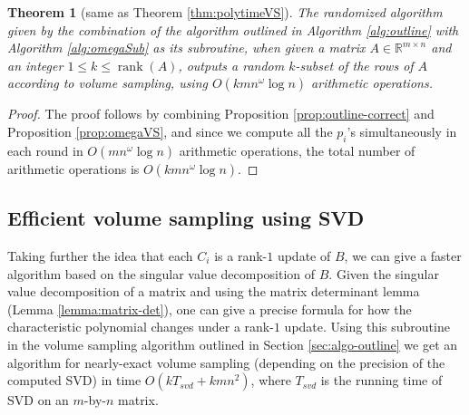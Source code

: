 \documentclass[11pt]{article}
\newcommand{\rank}{\operatorname{rank}}
\newtheorem{theorem}{Theorem}
\def\reals{\mathbb{R}}
\begin{document}
\begin{theorem}[same as Theorem \ref{thm:polytimeVS}]
The randomized algorithm given by the combination of the algorithm outlined in Algorithm \ref{alg:outline} with Algorithm \ref{alg:omegaSub} as its subroutine, when given a matrix $A \in \reals^{m \times n}$ and an integer $1 \leq k \leq \rank(A)$, outputs a random $k$-subset of the rows of $A$ according to volume sampling, using $O(kmn^\omega \log n)$ arithmetic operations.
\end{theorem}
\begin{proof}
The proof follows by combining Proposition \ref{prop:outline-correct} and Proposition \ref{prop:omegaVS}, and since we compute all the $p_{i}$'s simultaneously in each round in $O(mn^{\omega} \log n)$ arithmetic operations, the total number of arithmetic operations is $O(kmn^{\omega} \log n)$.
\end{proof}

\subsection{Efficient volume sampling using SVD} \label{subsec:svd}
Taking further the idea that each $C_{i}$ is a rank-$1$ update of $B$, we can give a faster algorithm based on the singular value decomposition of $B$. Given the singular value decomposition of a matrix and using the matrix determinant lemma (Lemma \ref{lemma:matrix-det}), one can give a precise formula for how the characteristic polynomial changes under a rank-$1$ update. Using this subroutine in the volume sampling algorithm outlined in Section \ref{sec:algo-outline} we get an algorithm for nearly-exact volume sampling (depending on the precision of the computed SVD) in time $O(kT_{svd} + kmn^{2})$, where $T_{svd}$ is the running time of SVD on an $m$-by-$n$ matrix.
\end{document}
